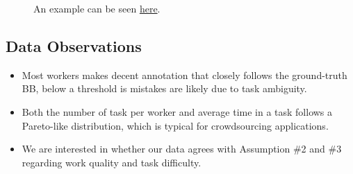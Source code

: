 \documentclass[12pt]{article}
\begin{document}
\begin{figure}[ht]
\centering
{}
\caption{An example can be seen  \href{http://crowd-segment.herokuapp.com/segment/COCO_train2014_000000000127/10/}{here}.}
\label{interface}
\end{figure}
\subsection{Data Observations}
\begin{itemize}
\item Most workers makes decent annotation that closely follows the ground-truth BB, below a threshold is mistakes are likely due to task ambiguity.
\item Both the number of task per worker and average time in a task follows a Pareto-like distribution, which is typical for crowdsourcing applications.
\item We are interested in whether our data agrees with Assumption \#2 and \#3 regarding work quality and task difficulty. 

\end{itemize}
\end{document}
